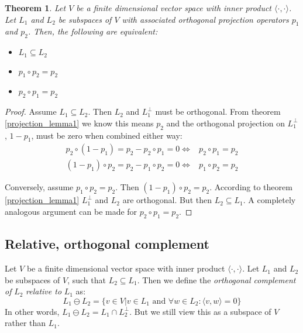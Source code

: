 \documentclass[12pt, a4paper]{article}
\newtheorem{theorem}{Theorem}[section]
\numberwithin{equation}{section}
\begin{document}
\begin{theorem}
\label{projection_lemma2}
Let $V$ be a finite dimensional vector space with inner product $\langle\cdot,\cdot\rangle$. Let $L_1$ and $L_2$ be subspaces of $V$ with associated orthogonal projection operators $p_1$ and $p_2$. Then, the following are equivalent:
\begin{itemize}
\item $L_1\subseteq L_2$
\item $p_1\circ p_2=p_2$
\item $p_2\circ p_1=p_2$
\end{itemize}
\end{theorem}
\begin{proof}
Assume $L_1\subseteq L_2$. Then $L_2$ and $L_1^\perp$ must be orthogonal. From theorem \ref{projection_lemma1} we know this means $p_2$ and the orthogonal projection on $L_1^\perp$, $1-p_1$, must be zero when combined either way:
\begin{align}
p_2\circ(1-p_1)=p_2-p_2\circ p_1=0\Leftrightarrow& p_2\circ p_1=p_2 \\
(1-p_1)\circ p_2=p_2-p_1\circ p_2=0\Leftrightarrow& p_1\circ p_2=p_2
\end{align}

Conversely, assume $p_1\circ p_2=p_2$. Then $(1-p_1)\circ p_2=p_2$. According to theorem \ref{projection_lemma1} $L_1^\perp$ and $L_2$ are orthogonal. But then $L_2\subseteq L_1$. A completely analogous argument can be made for $p_2\circ p_1=p_2$.
\end{proof}

\subsection{Relative, orthogonal complement}
Let $V$ be a finite dimensional vector space with inner product $\langle\cdot,\cdot\rangle$. Let $L_1$ and $L_2$ be subspaces of $V$, such that $L_2\subseteq L_1$. Then we define the \textit{orthogonal complement of} $L_2$ \textit{relative to} $L_1$ as:
\begin{equation}
L_1\ominus L_2=\{v\in V|v\in L_1\textrm{ and }\forall w\in L_2: \langle v,w\rangle = 0\}
\end{equation}
In other words, $L_1\ominus L_2=L_1\cap L_2^\perp$. But we still view this as a subspace of $V$ rather than $L_1$.
\end{document}
